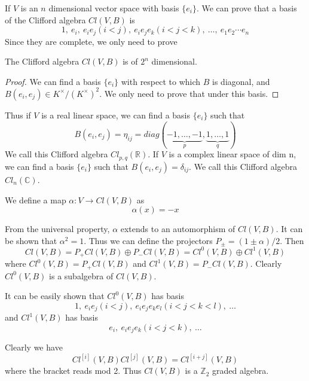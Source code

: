 \documentclass[12pt]{book}
\begin{document}
	If $V$ is an $n$ dimensional vector space with basis $\{e_i\}$. We can prove that a basis of the Clifford algebra $Cl(V,B)$ is
	\begin{equation}
		1,\ e_i,\ e_ie_j (i<j),\ e_ie_je_k (i<j<k),\ \dots,\ e_1e_2\cdots e_n
	\end{equation}
	Since they are complete, we only need to prove
	\begin{lemma}
		The Clifford algebra $Cl(V,B)$ is of $2^n$ dimensional.
	\end{lemma}
	\begin{proof}
		We can find a basis $\{e_i\}$ with respect to which $B$ is diagonal, and $B(e_i,e_j)\in K^\times/(K^\times)^2$. We only need to prove that under this basis.
		
	\end{proof}
	
	Thus if $V$ is a real linear space, we can find a basis $\{e_i\}$ such that
	\begin{equation}
		B(e_i,e_j)=\eta_{ij}=diag(\underbrace{-1,\dots,-1}_p,\underbrace{1,\dots,1}_q)
	\end{equation}
	We call this Clifford algebra $Cl_{p,q}(\mathbb R)$. If $V$ is a complex linear space of dim n, we can find a basis $\{e_i\}$ such that $B(e_i,e_j)=\delta_{ij}$. We call this Clifford algebra $Cl_n(\mathbb C)$. 
		
	We define a map $\alpha:V\rightarrow Cl(V,B)$ as
	\begin{equation}
		\alpha(x)=-x
	\end{equation}
	
	From the universal property, $\alpha$ extends to an automorphism of $Cl(V,B)$. It can be shown that $\alpha^2=1$. Thus we can define the projectors $P_\pm=(1\pm\alpha)/2$. Then
	\begin{equation}
		Cl(V,B)=P_+Cl(V,B)\oplus P_-Cl(V,B)=Cl^0(V,B)\oplus Cl^1(V,B)
	\end{equation}
	where $Cl^0(V,B)=P_+Cl(V,B)$ and $Cl^1(V,B)=P_-Cl(V,B)$. Clearly $Cl^0(V,B)$ is a subalgebra of $Cl(V,B)$.
	
	It can be easily shown that $Cl^0(V,B)$ has basis 
	\begin{equation}
		1,\ e_ie_j (i<j),\ e_ie_je_ke_l (i<j<k<l),\ \dots
	\end{equation}
	and $Cl^1(V,B)$ has basis 
	\begin{equation}
		e_i,\ e_ie_je_k (i<j<k),\ \dots
	\end{equation}
	
	Clearly we have
	\begin{equation}
		Cl^{[i]}(V,B)Cl^{[j]}(V,B)=Cl^{[i+j]}(V,B)
	\end{equation}
	where the bracket reads mod 2. Thus $Cl(V,B)$ is a $\mathbb Z_2$ graded algebra.
	
\end{document}
